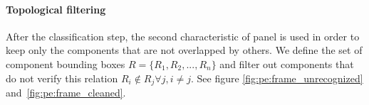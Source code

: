 \paragraph{Topological filtering} %
\label{par:topological_filtering}
After the classification step, the second characteristic of panel is used in order to keep only the components that are not overlapped by others.
We define the set of component bounding boxes $R = \{R_1, R_2, ... , R_n\}$ and filter out components that do not verify this relation $R_i\notin{R_j} \forall j, i \neq j$.
See figure \ref{fig:pe:frame_unrecognized} and~\ref{fig:pe:frame_cleaned}.






